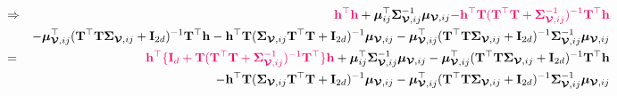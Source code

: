 \documentclass[12pt]{article}
\newcommand{\0}{\mathbf{0}}
\begin{document}
\begin{eqnarray*}
& \Rightarrow & \textcolor{barbiepink}{ \mathbf{h}^{\top} \mathbf{h} } + \boldsymbol{\mu}_{ij}^{\top} \boldsymbol{\Sigma}_{\boldsymbol{\mathcal{V}}, ij}^{-1} \boldsymbol{\mu}_{\boldsymbol{\mathcal{V}}, ij} \textcolor{barbiepink}{ - \mathbf{h}^{\top} \mathbf{T} ( \mathbf{T}^{\top} \mathbf{T} + \boldsymbol{\Sigma}_{\boldsymbol{\mathcal{V}}, ij}^{-1} )^{-1} \mathbf{T}^{\top} \mathbf{h} } \\
&& - \boldsymbol{\mu}_{\boldsymbol{\mathcal{V}}, ij}^{\top} ( \mathbf{T}^{\top} \mathbf{T} \boldsymbol{\Sigma}_{\boldsymbol{\mathcal{V}}, ij} + \mathbf{I}_{2d} )^{-1} \mathbf{T}^{\top} \mathbf{h} -  \mathbf{h}^{\top} \mathbf{T} ( \boldsymbol{\Sigma}_{\boldsymbol{\mathcal{V}}, ij} \mathbf{T}^{\top} \mathbf{T}  + \mathbf{I}_{2d} )^{-1} \boldsymbol{\mu}_{\boldsymbol{\mathcal{V}}, ij} -  \boldsymbol{\mu}_{\boldsymbol{\mathcal{V}}, ij}^{\top} ( \mathbf{T}^{\top} \mathbf{T} \boldsymbol{\Sigma}_{\boldsymbol{\mathcal{V}}, ij}  + \mathbf{I}_{2d} )^{-1} \boldsymbol{\Sigma}_{\boldsymbol{\mathcal{V}}, ij}^{-1}\boldsymbol{\mu}_{\boldsymbol{\mathcal{V}}, ij} \\
& = & \textcolor{barbiepink}{ \mathbf{h}^{\top} \{ \mathbf{I}_d + \mathbf{T} ( \mathbf{T}^{\top} \mathbf{T} + \boldsymbol{\Sigma}_{\boldsymbol{\mathcal{V}}, ij}^{-1} )^{-1} \mathbf{T}^{\top} \} \mathbf{h}} + \boldsymbol{\mu}_{ij}^{\top} \boldsymbol{\Sigma}_{\boldsymbol{\mathcal{V}}, ij}^{-1} \boldsymbol{\mu}_{\boldsymbol{\mathcal{V}}, ij} - \boldsymbol{\mu}_{\boldsymbol{\mathcal{V}}, ij}^{\top} ( \mathbf{T}^{\top} \mathbf{T} \boldsymbol{\Sigma}_{\boldsymbol{\mathcal{V}}, ij} + \mathbf{I}_{2d} )^{-1} \mathbf{T}^{\top} \mathbf{h}  \\
& & -  \mathbf{h}^{\top} \mathbf{T} ( \boldsymbol{\Sigma}_{\boldsymbol{\mathcal{V}}, ij} \mathbf{T}^{\top} \mathbf{T}  + \mathbf{I}_{2d} )^{-1} \boldsymbol{\mu}_{\boldsymbol{\mathcal{V}}, ij}  -  \boldsymbol{\mu}_{\boldsymbol{\mathcal{V}}, ij}^{\top} ( \mathbf{T}^{\top} \mathbf{T} \boldsymbol{\Sigma}_{\boldsymbol{\mathcal{V}}, ij}  + \mathbf{I}_{2d} )^{-1} \boldsymbol{\Sigma}_{\boldsymbol{\mathcal{V}}, ij}^{-1}\boldsymbol{\mu}_{\boldsymbol{\mathcal{V}}, ij}
\end{eqnarray*}
\end{document}
